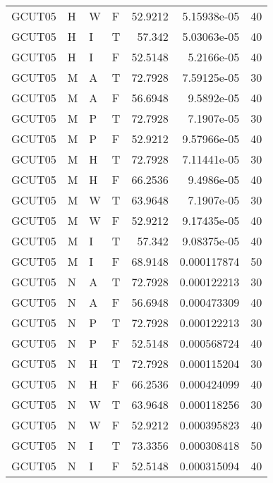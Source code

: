 \begin{table}[!htb]
{\begin{tabular}{llllrrr}
            GCUT05   & H     & W     & F          & 52.9212    & 5.15938e-05 & 40       \\
            GCUT05   & H     & I     & T          & 57.342     & 5.03063e-05 & 40       \\
            GCUT05   & H     & I     & F          & 52.5148    & 5.2166e-05  & 40       \\
            GCUT05   & M     & A     & T          & 72.7928    & 7.59125e-05 & 30       \\
            GCUT05   & M     & A     & F          & 56.6948    & 9.5892e-05  & 40       \\
            GCUT05   & M     & P     & T          & 72.7928    & 7.1907e-05  & 30       \\
            GCUT05   & M     & P     & F          & 52.9212    & 9.57966e-05 & 40       \\
            GCUT05   & M     & H     & T          & 72.7928    & 7.11441e-05 & 30       \\
            GCUT05   & M     & H     & F          & 66.2536    & 9.4986e-05  & 40       \\
            GCUT05   & M     & W     & T          & 63.9648    & 7.1907e-05  & 30       \\
            GCUT05   & M     & W     & F          & 52.9212    & 9.17435e-05 & 40       \\
            GCUT05   & M     & I     & T          & 57.342     & 9.08375e-05 & 40       \\
            GCUT05   & M     & I     & F          & 68.9148    & 0.000117874 & 50       \\
            GCUT05   & N     & A     & T          & 72.7928    & 0.000122213 & 30       \\
            GCUT05   & N     & A     & F          & 56.6948    & 0.000473309 & 40       \\
            GCUT05   & N     & P     & T          & 72.7928    & 0.000122213 & 30       \\
            GCUT05   & N     & P     & F          & 52.5148    & 0.000568724 & 40       \\
            GCUT05   & N     & H     & T          & 72.7928    & 0.000115204 & 30       \\
            GCUT05   & N     & H     & F          & 66.2536    & 0.000424099 & 40       \\
            GCUT05   & N     & W     & T          & 63.9648    & 0.000118256 & 30       \\
            GCUT05   & N     & W     & F          & 52.9212    & 0.000395823 & 40       \\
            GCUT05   & N     & I     & T          & 73.3356    & 0.000308418 & 50       \\
            GCUT05   & N     & I     & F          & 52.5148    & 0.000315094 & 40       \\
            \hline
        \end{tabular}
    }{}
\end{table}